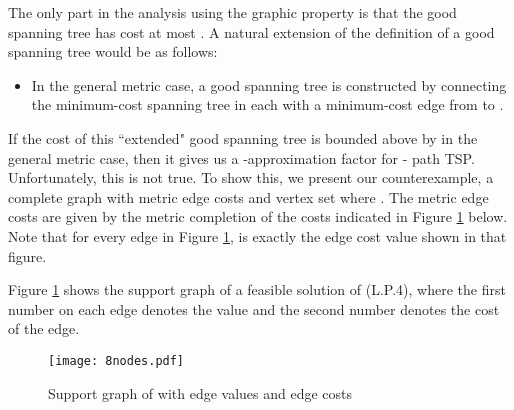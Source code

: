 \documentclass[11pt]{article}
\begin{document}
The only part in the analysis using the graphic property is
that the good spanning tree has cost at most . A natural extension of the definition of a good spanning tree would be as follows:
\begin{itemize}
\item In the general metric case, a good spanning tree is constructed by connecting the minimum-cost spanning tree in each  with a minimum-cost edge from  to .
\end{itemize}
If the cost of this ``extended" good spanning tree is bounded above by  in the general metric case,
then it gives us a -approximation factor for - path TSP.
Unfortunately, this is not true. To show this, we present our counterexample, a complete graph 
with metric edge costs  and vertex set  where . The metric edge costs  are given by the metric completion of the costs indicated in Figure \ref{optSoln} below. Note that for every edge  in Figure \ref{optSoln},  is exactly the edge cost value shown in that figure.

Figure \ref{optSoln} shows the support graph of a feasible solution  of (L.P.4),
where the first number on each edge denotes the  value and the second number denotes the cost of the edge.

\begin{figure}[h]
\begin{center}
\texttt{[image: 8nodes.pdf]}\\
  \caption{Support graph of  with edge  values and edge costs}
  \label{optSoln}
\end{center}
\end{figure}
\end{document}
